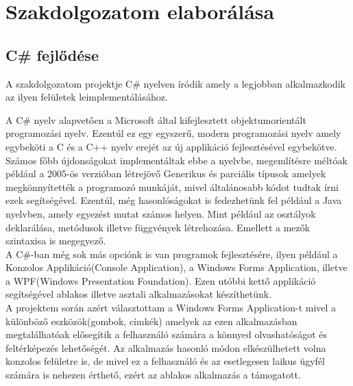 \documentclass[tocnopagenum]{thesis-ekf}
\theoremstyle{definition}
\theoremstyle{remark}
\begin{document}
	\chapter{Szakdolgozatom elaborálása}
	\section{C\# fejlődése}

	A szakdolgozatom projektje C\# nyelven íródik amely a legjobban alkalmazkodik az ilyen felületek leimplementálásához. 
	
	A C\# nyelv alapvetően a Microsoft által kifejlesztett objektumorientált programozási nyelv.
	Ezentúl ez egy egyszerű, modern programozási nyelv amely egybeköti a C és a C++ nyelv erejét az új applikáció fejlesztésével egybekötve. \cite{hejlsberg2003c}
	\\ 
	Számos főbb újdonságokat implementáltak ebbe a nyelvbe, megemlítésre méltóak például a 2005-ös verzióban létrejövő Generikus és parciális típusok amelyek megkönnyítették a programozó munkáját, mivel általánosabb kódot tudtak írni ezek segítségével.
	Ezentúl, még hasonlóságokat is fedezhetünk fel például a Java nyelvben, amely egyezést mutat számos helyen.
	Mint például az osztályok deklarálása, metódusok illetve függvények létrehozása. Emellett a mezők szintaxisa is megegyező.
	\\
	A C\#-ban még sok más opciónk is van programok fejlesztésére, ilyen például a Konzolos Applikáció(Console Application), a Windows Forms Application, illetve a WPF(Windows Presentation Foundation). Ezen utóbbi kettő applikáció segítségével ablakos illetve asztali alkalmazásokat készíthetünk. \cite{almeida2018visual}
	\\
	A projektem során azért választottam a Windows Forms Application-t mivel a különböző eszközök(gombok, címkék) amelyek az ezen alkalmazásban megtalálhatóak elősegítik a felhasználó számára a könnyed olvashatóságot és feltérképezés lehetőségét. Az alkalmazás hasonló módon elkészülhetett volna konzolos felületre is, de mivel ez a felhasználó és az esetlegesen laikus ügyfél számára is nehezen érthető, ezért az ablakos alkalmazás a támogatott.
	\\ 
\end{document}
